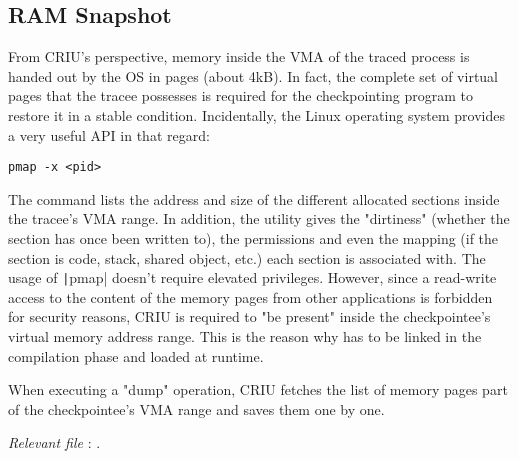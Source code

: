 \subsection*{RAM Snapshot}
From CRIU's perspective, memory inside the \gls{VMA} of the traced process is handed out by the OS in pages (about 4kB). In fact, the complete set of virtual pages that the tracee possesses is required for the checkpointing program to restore it in a stable condition. Incidentally, the Linux operating system provides a very useful API in that regard:
\begin{verbatim}
pmap -x <pid>
\end{verbatim}
The command lists the address and size of the different allocated sections inside the tracee's \gls{VMA} range. In addition, the utility gives the "dirtiness"  (whether the section has once been written to), the permissions and even the mapping (if the section is code, stack, shared object, etc.) each section is associated with. The usage of \texttt|pmap| doesn't require elevated privileges. However, since a read-write access to the content of the memory pages from other applications is forbidden for security reasons, CRIU is required to "be present" inside the checkpointee's virtual memory address range. This is the reason why  has to be linked in the compilation phase and loaded at runtime. 

When executing a "dump" operation, CRIU fetches the list of memory pages part of the checkpointee's VMA range and saves them one by one. 

\hfill\textit{Relevant file }: .